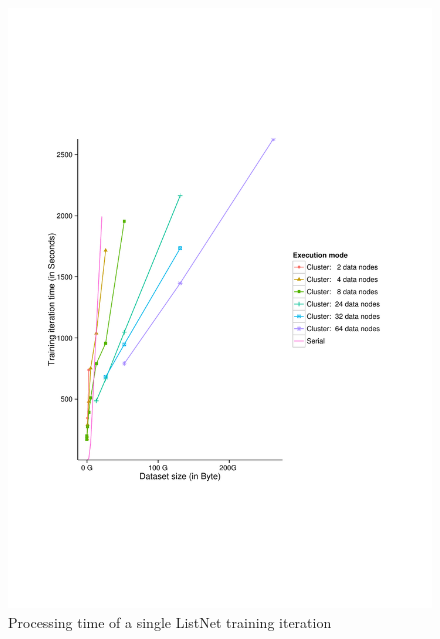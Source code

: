 \begin{figure}[!h]
\centering
\includegraphics[trim=0cm 5cm 0cm 5cm, scale=0.8]{gfx/time_single.pdf}
\caption{Processing time of a single ListNet training iteration}
\label{fig:listnet_train_time}
\end{figure}

